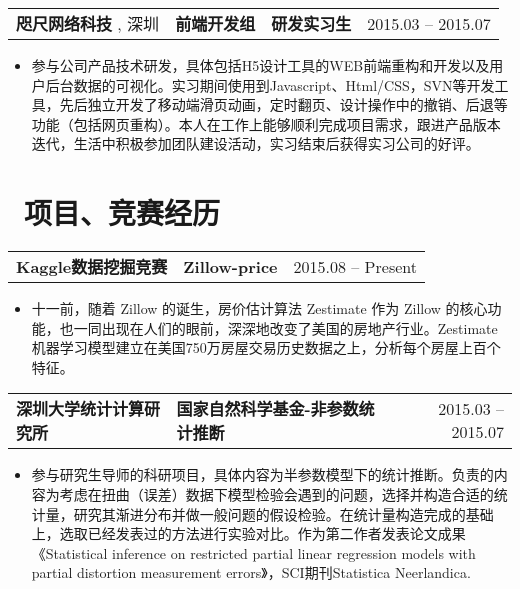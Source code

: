 \documentclass{resume}
\begin{document}
	\begin{tabularx}{\textwidth}{@{}X X X r@{}}
	\textbf{咫尺网络科技 }, 深圳 & \textbf{前端开发组} & \textbf{研发实习生} & 2015.03 -- 2015.07 \\
\end{tabularx}
\begin{itemize}
	\item 参与公司产品技术研发，具体包括H5设计工具的WEB前端重构和开发以及用户后台数据的可视化。实习期间使用到Javascript、Html/CSS，SVN等开发工具，先后独立开发了移动端滑页动画，定时翻页、设计操作中的撤销、后退等功能（包括网页重构）。本人在工作上能够顺利完成项目需求，跟进产品版本迭代，生活中积极参加团队建设活动，实习结束后获得实习公司的好评。
\end{itemize}
	
	
	\section{\faGraduationCap\ 项目、竞赛经历}
	\begin{tabularx}{\textwidth}{@{}X X r@{}}
		\textbf{Kaggle数据挖掘竞赛} & \textbf{Zillow-price} & 2015.08 -- Present \\
	\end{tabularx}
	\begin{itemize}
		\item 十一前，随着 Zillow 的诞生，房价估计算法 Zestimate 作为 Zillow 的核心功能，也一同出现在人们的眼前，深深地改变了美国的房地产行业。Zestimate 机器学习模型建立在美国750万房屋交易历史数据之上，分析每个房屋上百个特征。
	\end{itemize}
	
	\begin{tabularx}{\textwidth}{@{}X X r@{}}
		\textbf{深圳大学统计计算研究所} & \textbf{国家自然科学基金-非参数统计推断} & 2015.03 -- 2015.07 \\
	\end{tabularx}
	\begin{itemize}
		\item 参与研究生导师的科研项目，具体内容为半参数模型下的统计推断。负责的内容为考虑在扭曲（误差）数据下模型检验会遇到的问题，选择并构造合适的统计量，研究其渐进分布并做一般问题的假设检验。在统计量构造完成的基础上，选取已经发表过的方法进行实验对比。作为第二作者发表论文成果《Statistical inference on restricted partial linear regression models with partial distortion measurement errors》，SCI期刊Statistica Neerlandica. 
	\end{itemize}
	
\end{document}
